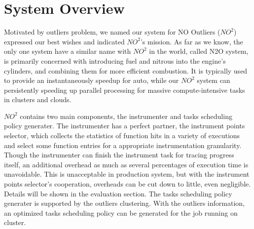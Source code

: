\section{System Overview}

Motivated by outliers problem, we named our system for NO Outliers ($NO^2$) expressed our best wishes and indicated $NO^2$'s mission. As far as we know, the only one system have a similar name with $NO^2$ in the world, called N2O system, is primarily concerned with introducing fuel and nitrous into the engine's cylinders, and combining them for more efficient combustion. It is typically used to provide an instantaneously speedup for auto, while our $NO^2$ system can persistently speeding up parallel processing for massive compute-intensive tasks in clusters and clouds.

$NO^2$ contains two main components, the instrumenter and tasks scheduling policy generater. The instrumenter has a perfect partner, the instrument points selector, which collects the statistics of function hits in a variety of executions and select some function entries for a appropriate instrumentation granularity. Though the instrumenter can finish the instrument task for tracing progress itself, an additional overhead as much as several percentages of execution time is unavoidable. This is unacceptable in production system, but with the instrument points selector's cooperation, overheads can be cut down to little, even negligible. Details will be shown in the evaluation section. The tasks scheduling policy generater is supported by the outliers clustering. With the outliers information, an optimized tasks scheduling policy can be generated for the job running on cluster.

